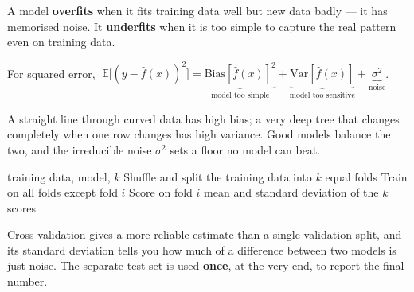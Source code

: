\documentclass[11pt,a4paper]{article}
\begin{document}
\begin{bdef}
A model \textbf{overfits} when it fits training data well but new data badly --- it has memorised noise. It \textbf{underfits} when it is too simple to capture the real pattern even on training data.
\end{bdef}
\begin{bmath}
For squared error, $\;\mathbb{E}\big[(y-\hat f(x))^2\big]=\underbrace{\mathrm{Bias}[\hat f(x)]^2}_{\text{model too simple}}+\underbrace{\mathrm{Var}[\hat f(x)]}_{\text{model too sensitive}}+\underbrace{\sigma^2}_{\text{noise}}$.
\end{bmath}
A straight line through curved data has high bias; a very deep tree that changes completely when one row changes has high variance. Good models balance the two, and the irreducible noise $\sigma^2$ sets a floor no model can beat.

\begin{balgo}
\begin{algorithmic}[1]
\Require training data, model, $k$
\State Shuffle and split the training data into $k$ equal folds
  \State Train on all folds except fold $i$
  \State Score on fold $i$
\EndFor
\State \Return mean and standard deviation of the $k$ scores
\end{algorithmic}
\end{balgo}
Cross-validation gives a more reliable estimate than a single validation split, and its standard deviation tells you how much of a difference between two models is just noise. The separate test set is used \textbf{once}, at the very end, to report the final number.
\end{document}
